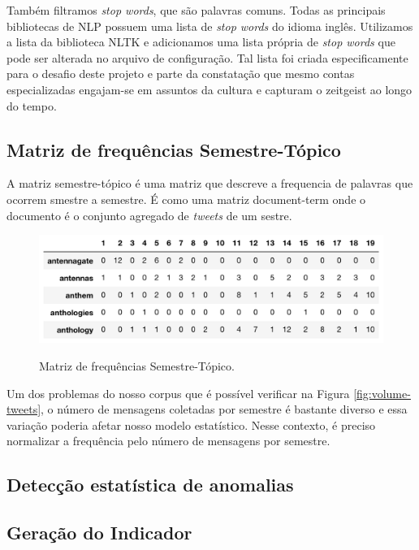 \documentclass[paper=a4, fontsize=11pt]{scrartcl}
\numberwithin{equation}{section}		%
\numberwithin{figure}{section}			%
\numberwithin{table}{section}				%
\begin{document}
Também filtramos \emph{stop words}, que são palavras comuns. Todas as principais bibliotecas de NLP possuem uma lista de \emph{stop words} do idioma inglês. Utilizamos a lista da biblioteca NLTK \citep{nltk} e adicionamos uma lista própria de \emph{stop words} que pode ser alterada no arquivo de configuração. Tal lista foi criada especificamente para o desafio deste projeto e parte da constatação que mesmo contas especializadas engajam-se em assuntos da cultura e capturam o zeitgeist ao longo do tempo.

\subsection{Matriz de frequências Semestre-Tópico}
A matriz semestre-tópico é uma matriz que descreve a frequencia de palavras que ocorrem smestre a semestre. É como uma matriz document-term onde o documento é o conjunto agregado de \emph{tweets} de um sestre. 
\begin{figure}[h]
	\centering
	\caption{Matriz de frequências Semestre-Tópico.}
	\includegraphics[width=.8\columnwidth]{sem-term}
	\label{fig:sem-term}
\end{figure}
Um dos problemas do nosso corpus que é possível verificar na Figura \ref{fig:volume-tweets}, o número de mensagens coletadas por semestre é bastante diverso e essa variação poderia afetar nosso modelo estatístico. Nesse contexto, é preciso normalizar a frequência pelo número de mensagens por semestre.
\subsection{Detecção estatística de anomalias}
\subsection{Geração do Indicador}
\end{document}
